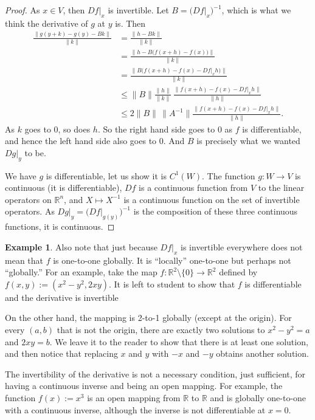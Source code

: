 \documentclass[12pt,openany]{book}
\newcommand{\snorm}[1]{\lVert {#1} \rVert}
\newcommand{\R}{{\mathbb{R}}}
\theoremstyle{plain}
\theoremstyle{remark}
\theoremstyle{definition}
\theoremstyle{exercise}
\theoremstyle{example}
\newtheorem{example}[thm]{Example}
\begin{document}
\begin{proof}
As $x \in V$, then $Df|_x$ is invertible.
Let $B = \bigl(Df|_x\bigr)^{-1}$, which is what we think the derivative of
$g$ at $y$ is.  Then
\begin{equation*}
\begin{split}
\frac{\snorm{g(y+k)-g(y)-Bk}}{\snorm{k}}
& =
\frac{\snorm{h-Bk}}{\snorm{k}}
\\
& =
\frac{\snorm{h-B\bigl(f(x+h)-f(x)\bigr)}}{\snorm{k}}
\\
& =
\frac{\snorm{B\bigl(f(x+h)-f(x)-Df|_x h\bigr)}}{\snorm{k}}
\\
& \leq
\snorm{B}
\frac{\snorm{h}}{\snorm{k}}\,
\frac{\snorm{f(x+h)-f(x)-Df|_x h}}{\snorm{h}}
\\
& \leq
2\snorm{B} \, \snorm{A^{-1}}
\frac{\snorm{f(x+h)-f(x)-Df|_x h}}{\snorm{h}} .
\end{split}
\end{equation*}
As $k$ goes to 0, so does $h$.  So the right hand side goes to 0 as $f$ is
differentiable, and hence
the left hand side also goes to 0.  And
$B$ is precisely what we wanted $Dg|_y$ to be.

We have $g$ is differentiable, let us show it is $C^1(W)$.
The function $g \colon W \to V$ is continuous (it is differentiable),
$Df$ is a continuous function from $V$
to the linear operators on $\R^n$,
and $X \mapsto X^{-1}$ is a continuous function on
the set of invertible operators.
As
$Dg|_y = {\bigl( Df|_{g(y)}\bigr)}^{-1}$ is the composition
of these three
continuous functions, it is continuous.
\end{proof}

\begin{example}
Also note that just because $Df|_x$ is invertible everywhere does not
mean that $f$ is
one-to-one globally.  It is ``locally'' one-to-one but perhaps not
``globally.''  For an
example, take the map $f \colon \R^2 \setminus \{ 0 \} \to \R^2$ defined
by $f(x,y) := (x^2-y^2,2xy)$.
It is left to student to show that $f$ is
differentiable and the derivative is invertible

On the other hand, the mapping is 2-to-1 globally (except at the origin).
For every
$(a,b)$ that is not the origin, there are exactly two
solutions to $x^2-y^2=a$ and $2xy=b$.  We leave it to the reader
to show that there is at least one solution, and then notice
that replacing $x$ and $y$ with $-x$ and $-y$ obtains another solution.
\end{example}

The invertibility of the derivative is not a necessary
condition, just sufficient, for having a continuous inverse and being an open
mapping.  For example, the function $f(x) := x^3$ is an open mapping from $\R$
to $\R$ and is globally one-to-one with a continuous inverse, although the
inverse is not differentiable at $x=0$.
\end{document}
